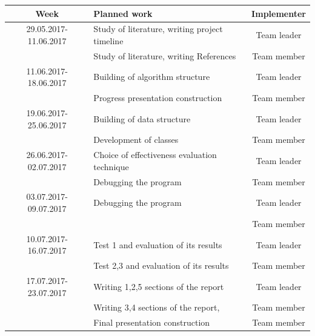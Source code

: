 \documentclass{scrartcl}
\begin{document}
\begin{tabular}{|c|l|c|} %
  \hline
Week & Planned work                     & Implementer \\
\hline
29.05.2017-11.06.2017 & Study of literature, writing project timeline    &  Team leader\\
& Study of literature, writing References &  Team member \\
\hline
11.06.2017-18.06.2017 & Building of algorithm structure & Team leader\\
& Progress presentation construction & Team member\\
\hline
19.06.2017-25.06.2017 & Building of data structure     &   Team leader\\
& Development of classes   & Team member \\
\hline
26.06.2017-02.07.2017 & Choice of effectiveness evaluation technique       &  Team leader\\
& Debugging the program   &   Team member \\
\hline
03.07.2017-09.07.2017 & Debugging the program     &   Team leader\\
&    & Team member\\
\hline
10.07.2017-16.07.2017 & Test 1 and evaluation of its results & Team leader   \\
& Test 2,3 and evaluation of its results & Team member  \\
\hline
17.07.2017-23.07.2017 & Writing 1,2,5 sections of the report  & Team leader \\
& Writing 3,4 sections of the report,  & Team member  \\
& Final presentation construction & Team member\\
\hline
\end{tabular}


\end{document}
